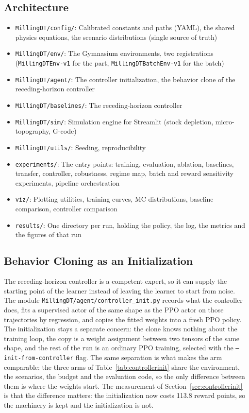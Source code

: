 \documentclass[11pt,a4paper]{article}
\begin{document}
\subsection{Architecture}
\begin{itemize}
    \item \texttt{MillingDT/config/}: Calibrated constants and paths (YAML), the shared physics equations, the scenario distributions (single source of truth)
    \item \texttt{MillingDT/env/}: The Gymnasium environments, two registrations (\texttt{MillingDTEnv-v1} for the part, \texttt{MillingDTBatchEnv-v1} for the batch)
    \item \texttt{MillingDT/agent/}: The controller initialization, the behavior clone of the receding-horizon controller
    \item \texttt{MillingDT/baselines/}: The receding-horizon controller
    \item \texttt{MillingDT/sim/}: Simulation engine for Streamlit (stock depletion, micro-topography, G-code)
    \item \texttt{MillingDT/utils/}: Seeding, reproducibility
    \item \texttt{experiments/}: The entry points: training, evaluation, ablation, baselines, transfer, controller, robustness, regime map, batch and reward sensitivity experiments, pipeline orchestration
    \item \texttt{viz/}: Plotting utilities, training curves, MC distributions, baseline comparison, controller comparison
    \item \texttt{results/}: One directory per run, holding the policy, the log, the metrics and the figures of that run
\end{itemize}

\subsection{Behavior Cloning as an Initialization}
The receding-horizon controller is a competent expert, so it can supply the starting point of the learner instead of leaving the learner to start from noise. The module \texttt{MillingDT/\allowbreak agent/\allowbreak controller\_init.py} records what the controller does, fits a supervised actor of the same shape as the PPO actor on those trajectories by regression, and copies the fitted weights into a fresh PPO policy. The initialization stays a separate concern: the clone knows nothing about the training loop, the copy is a weight assignment between two tensors of the same shape, and the rest of the run is an ordinary PPO training, selected with the \texttt{--init-\allowbreak from-\allowbreak controller} flag. The same separation is what makes the arm comparable: the three arms of Table~\ref{tab:controllerinit} share the environment, the scenarios, the budget and the evaluation code, so the only difference between them is where the weights start. The measurement of Section~\ref{sec:controllerinit} is that the difference matters: the initialization now costs 113.8 reward points, so the machinery is kept and the initialization is not.
\end{document}
